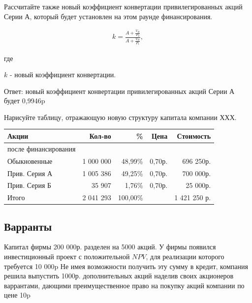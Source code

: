 \documentclass[12pt, table, a4paper,twoside]{exam}
\begin{document}
\begin{questions}
\begin{subparts}
	\subpart[5] Рассчитайте также новый коэффициент конвертации привилегированных акций Серии А, который будет установлен на этом раунде финансирования.
	
	\begin{solution}[9em]
		\begin{align}
		k=\frac{A+\frac{V_B}{P_0}}{A+\frac{V_B}{P_1}},
		\end{align}
		
		где
		
		$k$ - новый коэффициент конвертации.
		
		Ответ: новый коэффициент конвертации привилегированных акций Серии А будет 0,9946p
	\end{solution}
	
	\subpart[5] Нарисуйте таблицу, отражающую новую структуру капитала компании ХХХ.
	\begin{solution}[12em]
		
		\begin{tabular}{lrrrr}
			\toprule
			Акции & Кол-во & \%    & Цена  & Стоимость \\
			\midrule
			после финансирования &       &       &       &  \\
			Обыкновенные &                 1 000 000    & 48,99\% &               0,70р.  &            696 250р.  \\
			Прив. Серия А &                 1 005 386    & 49,25\% &               0,70р.  &            700 000р.  \\
			Прив. Серия Б &                       35 907    & 1,76\% &               0,70р.  &              25 000р.  \\
			Итого &                 2 041 293    & 100,00\% &       &         1 421 250 р.  \\
			\bottomrule
		\end{tabular}%
	\end{solution}
\end{subparts}
\addpoints

\subsection{Варранты}
\question[15] Капитал фирмы 200 000р. разделен на 5000 акций. У фирмы появился инвестиционный проект с положительной $NPV$, для реализации которого требуется 10 000p Не имея возможности получить эту сумму в кредит, компания решила выпустить 1000р. дополнительных акций наделив своих акционеров варрантами, дающими преимущественное право на покупку акций компании по цене 10p 


\end{questions}
\end{document}
